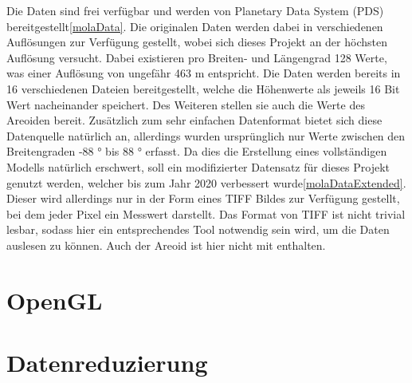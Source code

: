 Die Daten sind frei verfügbar und werden von Planetary Data System (PDS) bereitgestellt\ref{molaData}. Die originalen Daten werden dabei in verschiedenen Auflösungen zur Verfügung gestellt, wobei sich dieses Projekt an der höchsten Auflösung versucht. Dabei existieren pro Breiten- und Längengrad 128 Werte, was einer Auflösung von ungefähr 463 m entspricht. Die Daten werden bereits in 16 verschiedenen Dateien bereitgestellt, welche die Höhenwerte als jeweils 16 Bit Wert nacheinander speichert. Des Weiteren stellen sie auch die Werte des Areoiden bereit. Zusätzlich zum sehr einfachen Datenformat bietet sich diese Datenquelle natürlich an, allerdings wurden ursprünglich nur Werte zwischen den Breitengraden -88 ° bis 88 ° erfasst. Da dies die Erstellung eines vollständigen Modells natürlich erschwert, soll ein modifizierter Datensatz für dieses Projekt genutzt werden, welcher bis zum Jahr 2020 verbessert wurde\ref{molaDataExtended}. Dieser wird allerdings nur in der Form eines TIFF Bildes zur Verfügung gestellt, bei dem jeder Pixel ein Messwert darstellt. Das Format von TIFF ist nicht trivial lesbar, sodass hier ein entsprechendes Tool notwendig sein wird, um die Daten auslesen zu können. Auch der Areoid ist hier nicht mit enthalten.

\section{OpenGL}

\section{Datenreduzierung}\label{datenreduzierung}

